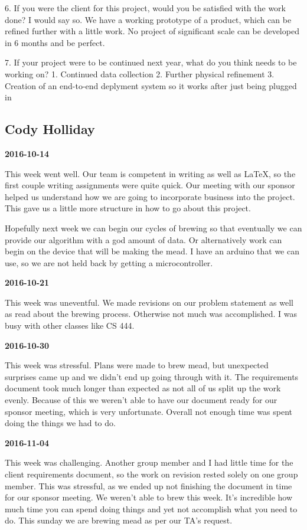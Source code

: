 6. If you were the client for this project, would you be satisfied with the work done?
I would say so. We have a working prototype of a product, which can be refined further with a little work. No project of significant scale can be developed in 6 months and be perfect.

7. If your project were to be continued next year, what do you think needs to be working on?
  1. Continued data collection
  2. Further physical refinement
  3. Creation of an end-to-end deplyment system so it works after just being plugged in

\subsection{Cody Holliday}

\textbf{2016-10-14}

This week went well. Our team is competent in writing as well as LaTeX, so the first couple writing assignments were quite quick. Our meeting with our sponsor helped us understand how we are going to incorporate business into the project. This gave us a little more structure in how to go about this project.

Hopefully next week we can begin our cycles of brewing so that eventually we can provide our algorithm with a god amount of data. Or alternatively work can begin on the device that will be making the mead. I have an arduino that we can use, so we are not held back by getting a microcontroller.

\textbf{2016-10-21}

This week was uneventful. We made revisions on our problem statement as well as read about the brewing process. Otherwise not much was accomplished. I was busy with other classes like CS 444.

\textbf{2016-10-30}

This week was stressful. Plans were made to brew mead, but unexpected surprises came up and we didn't end up going through with it. The requirements document took much longer than expected as not all of us split up the work evenly. Because of this we weren't able to have our document ready for our sponsor meeting, which is very unfortunate. Overall not enough time was spent doing the things we had to do.

\textbf{2016-11-04}

This week was challenging. Another group member and I had little time for the client requirements document, so the work on revision rested solely on one group member. This was stressful, as we ended up not finishing the document in time for our sponsor meeting. We weren't able to brew this week. It's incredible how much time you can spend doing things and yet not accomplish what you need to do. This sunday we are brewing mead as per our TA's request.

